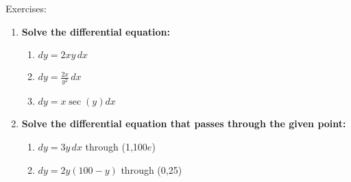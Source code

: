 \documentclass[../revisedmain.tex]{subfiles}
\begin{document}
\begin{center}
	\LARGE Exercises:
\end{center}
\begin{enumerate}
	\item \textbf{Solve the differential equation:}
	\begin{enumerate}
		\item $dy=2xy\,dx$
		\item $dy=\frac{2x}{y^2}\,dx$
		\item $dy=x\sec(y)dx$
	\end{enumerate}
	\item \textbf{Solve the differential equation that passes through the given point:}
	\begin{enumerate}
		\item $dy=3y\,dx$ through (1,100$e$)
		\item $dy=2y(100-y)$ through (0,25)
	\end{enumerate}
\end{enumerate}
\end{document}
